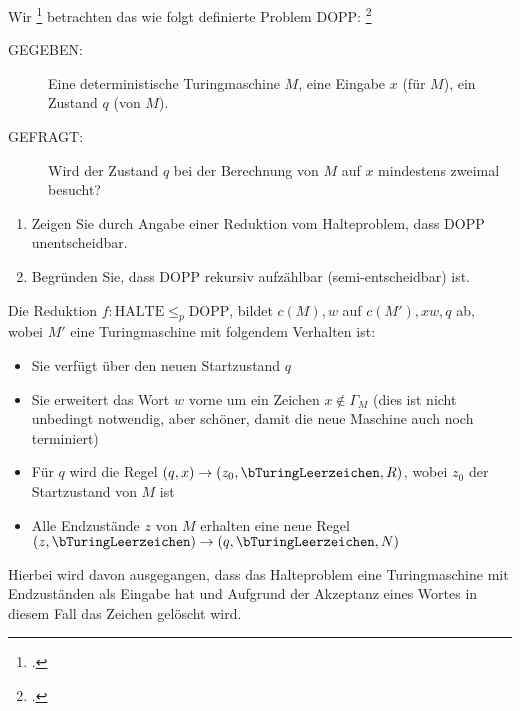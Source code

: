 \documentclass{bschlangaul-aufgabe}
\begin{document}

Wir
\footcite{examen:66115:2013:09} betrachten das wie folgt definierte Problem DOPP:
\footcite[Aufgabe 8]{theo:ab:4}

\begin{description}
\item[GEGEBEN:]

Eine deterministische Turingmaschine $M$, eine Eingabe $x$ (für $M$),
ein Zustand $q$ (von $M$).

\item[GEFRAGT:]

Wird der Zustand $q$ bei der Berechnung von $M$ auf $x$ mindestens
zweimal besucht?
\end{description}

\begin{enumerate}


\item Zeigen Sie durch Angabe einer Reduktion vom Halteproblem, dass
DOPP unentscheidbar.

\item Begründen Sie, dass DOPP rekursiv aufzählbar (semi-entscheidbar)
ist.

\end{enumerate}

Die Reduktion $f \colon \text{HALTE} \leq_p \text{DOPP}$, bildet $c(M),
w$ auf $c(M'), xw, q$ ab, wobei $M'$ eine Turingmaschine mit folgendem
Verhalten ist:

\begin{itemize}
\item Sie verfügt über den neuen Startzustand $q$

\item Sie erweitert das Wort $w$ vorne um ein Zeichen $x \notin
\Gamma_M$ (dies ist nicht unbedingt notwendig, aber schöner, damit die
neue Maschine auch noch terminiert)

\item Für $q$ wird die Regel $(q, x) \rightarrow (z_0,
\bTuringLeerzeichen, R)$, wobei $z_0$ der Startzustand von $M$ ist

\item Alle Endzustände $z$ von $M$ erhalten eine neue Regel $(z,
\bTuringLeerzeichen) \rightarrow (q, \bTuringLeerzeichen, N)$
\end{itemize}

Hierbei wird davon ausgegangen, dass das Halteproblem eine
Turingmaschine mit Endzuständen als Eingabe hat und Aufgrund der
Akzeptanz eines Wortes in diesem Fall das Zeichen gelöscht wird.
\end{document}
